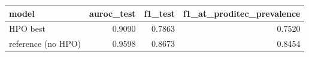 \begin{tabular}{lrrr}
\toprule
             model &  auroc\_test &  f1\_test &  f1\_at\_proditec\_prevalence \\
\midrule
          HPO best &      0.9090 &   0.7863 &                     0.7520 \\
reference (no HPO) &      0.9598 &   0.8673 &                     0.8454 \\
\bottomrule
\end{tabular}
